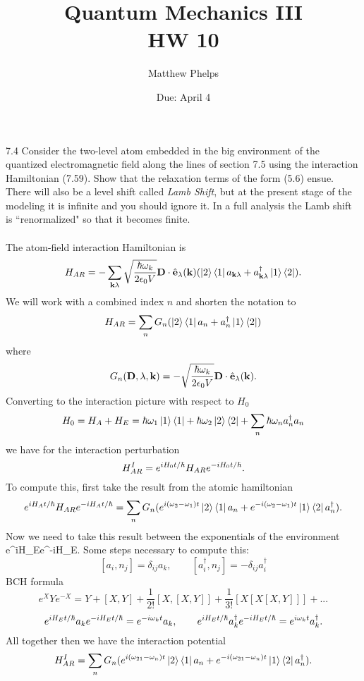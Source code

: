 \documentclass[10pt,letterpaper]{article}
\title{Quantum Mechanics III\\HW 10}
\author{Matthew Phelps}
\date{Due: April 4}
\begin{document}
\maketitle

\benum
\item[7.4]
Consider the two-level atom embedded in the big environment of the quantized electromagnetic field along the lines 
of section 7.5 using the interaction Hamiltonian (7.59). Show that the relaxation terms of the form (5.6) ensue. There
will also be a level shift called \emph{Lamb Shift}, but at the present stage of the modeling it is infinite and you 
should ignore it. In a full analysis the Lamb shift is ``renormalized" so that it becomes finite.\\ \\
The atom-field interaction Hamiltonian is
\[
	H_{AR} = -\sum_{\mathbf{k}\lambda}\sqrt\frac{\hbar\omega_k}{2\epsilon_0 V}\mathbf{D}\cdot\hat{\mathbf{e}}_{\mathbf{\lambda}}(\mathbf{k})
	(\ket 2\bra 1 a_{\mathbf{k}\lambda}+a_{\mathbf{k}\lambda}^\dag \ket 1\bra 2).
\]
We will work with a combined index $n$ and shorten the notation to
\[
	H_{AR} = \sum_{n}G_{n}
	(\ket 2\bra 1 a_{n}+a_{n}^\dag \ket 1\bra 2)
\]
where
\[
	G_n(\mathbf{D},\lambda,\mathbf{k}) = -\sqrt\frac{\hbar\omega_k}{2\epsilon_0 V}\mathbf{D}\cdot\hat{\mathbf{e}}_{\mathbf{\lambda}}(\mathbf{k}).
\]
Converting to the interaction picture with respect to $H_0$
\[
	H_0 = H_A + H_E = \hbar\omega_1 \ket 1\bra 1+\hbar\omega_2\ket 2\bra 2
	+\sum_{n}\hbar\omega_n a^\dag_n a_n
\]
we have for the interaction perturbation
\[
	H^I_{AR} = e^{iH_0t/\hbar}H_{AR}e^{-iH_0t/\hbar}.
\]
To compute this, first take the result from the atomic hamiltonian
\[
	e^{iH_At/\hbar}H_{AR}e^{-iH_At/\hbar} = \sum_n G_n (
	e^{i(\omega_2-\omega_1)t}\ket 2\bra 1 a_n+e^{-i(\omega_2-\omega_1)t}\ket 1\bra 2a_n^\dag).
\]
Now we need to take this result between the exponentials of the environment
\ba
	e^{iH_E}e^{-iH_E}.
\ea 
Some steps necessary to compute this:
\[
	[a_i, n_{j}] = \delta_{ij}a_k,\qquad [a_i^\dag,n_{j}] = -\delta_{ij}a^\dag_i
\]
\qquad\qquad BCH formula
\[
	e^{X}Ye^{-X} = Y+[X,Y]+\frac{1}{2!}[X,[X,Y]]+\frac{1}{3!}[X[X[X,Y]]]+...
\]
\[
	e^{iH_Et/\hbar}a_ke^{-iH_Et/\hbar} = e^{-i\omega_k t}a_k,
	\qquad e^{iH_Et/\hbar}a^\dag_ke^{-iH_Et/\hbar} = e^{i\omega_k t}a_k^\dag.
\]
All together then we have the interaction potential 
\[
	H^I_{AR} =  \sum_n G_n (
	e^{i(\omega_{21}-\omega_n)t}\ket 2\bra 1 a_n+e^{-i(\omega_{21}-\omega_n)t}\ket 1\bra 2a_n^\dag).
\]
\end{document}
